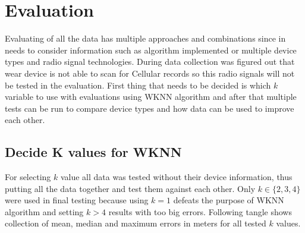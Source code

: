 \section{Evaluation}\label{sec:Evaluation}
Evaluating of all the data has multiple approaches and combinations since in needs to consider information such as algorithm implemented or multiple device types and radio signal technologies. During data collection was figured out that wear device is not able to scan for Cellular records so this radio signals will not be tested in the evaluation. First thing that needs to be decided is which $k$ variable to use with evaluations using WKNN algorithm and after that multiple tests can be run to compare device types and how data can be used to improve each other.

\subsection{Decide K values for WKNN}\label{sec:TestingKValuesForWKNN}
For selecting $k$ value all data was tested without their device information, thus putting all the data together and test them against each other. Only $k \in \{2, 3, 4\}$ were used in final testing because using $k = 1$ defeats the purpose of WKNN algorithm and setting $k > 4$ results with too big errors. Following tangle shows collection of mean, median and maximum errors in meters for all tested $k$ values.

\begin{table}[h]
	\begin{center}
		\caption{List of errors for multiple K values}
		\label{tab04c06}
	\end{center}
\end{table}

